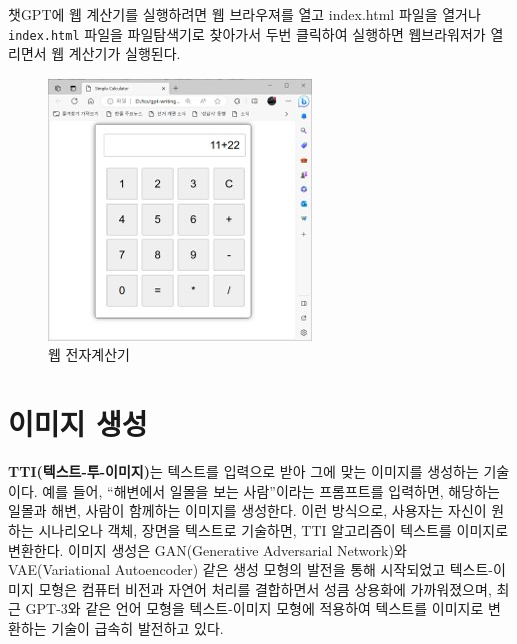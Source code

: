 \documentclass[
  letterpaper,
]{book}
\newenvironment{Shaded}{\begin{snugshade}}{\end{snugshade}}
\newcommand{\DecValTok}[1]{\textcolor[rgb]{0.68,0.00,0.00}{#1}}
\newcommand{\NormalTok}[1]{\textcolor[rgb]{0.00,0.23,0.31}{#1}}
\newcommand{\OperatorTok}[1]{\textcolor[rgb]{0.37,0.37,0.37}{#1}}
\begin{document}
챗GPT에 웹 계산기를 실행하려면 웹 브라우져를 열고 index.html 파일을
열거나 \texttt{index.html} 파일을 파일탐색기로 찾아가서 두번 클릭하여
실행하면 웹브라워저가 열리면서 웹 계산기가 실행된다.

\begin{Shaded}
\end{Shaded}

\begin{figure}

{\centering \includegraphics{images/calculator_web.jpg}

}

\caption{웹 전자계산기}

\end{figure}

\hypertarget{uxc774uxbbf8uxc9c0-uxc0dduxc131}{%
\section{이미지 생성}\label{uxc774uxbbf8uxc9c0-uxc0dduxc131}}

\textbf{TTI(텍스트-투-이미지)}는 텍스트를 입력으로 받아 그에 맞는
이미지를 생성하는 기술이다. 예를 들어, ``해변에서 일몰을 보는
사람''이라는 프롬프트를 입력하면, 해당하는 일몰과 해변, 사람이 함께하는
이미지를 생성한다. 이런 방식으로, 사용자는 자신이 원하는 시나리오나
객체, 장면을 텍스트로 기술하면, TTI 알고리즘이 텍스트를 이미지로
변환한다. 이미지 생성은 GAN(Generative Adversarial Network)와
VAE(Variational Autoencoder) 같은 생성 모형의 발전을 통해 시작되었고
텍스트-이미지 모형은 컴퓨터 비전과 자연어 처리를 결합하면서 성큼
상용화에 가까워졌으며, 최근 GPT-3와 같은 언어 모형을 텍스트-이미지
모형에 적용하여 텍스트를 이미지로 변환하는 기술이 급속히 발전하고 있다.
\end{document}
